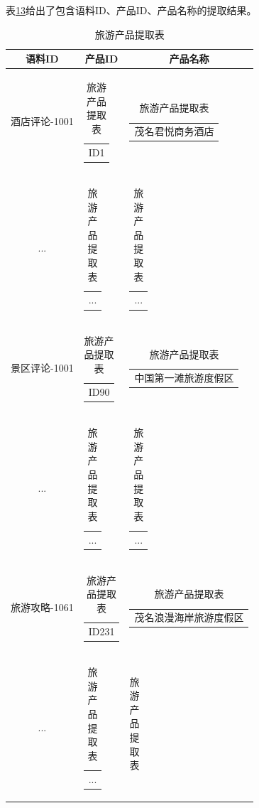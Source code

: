 \documentclass[bwprint]{gmcmthesis}
\begin{document}
表\ref{entity_related}给出了包含语料ID、产品ID、产品名称的提取结果。

\begin{center}
  \begin{longtable}{c|c|c}
    \caption{旅游产品提取表}
    \label{entity_related}\\
      \hline
      \textbf{语料ID} & \textbf{产品ID} & \textbf{产品名称} \\
      \hline
      酒店评论-1001 & \begin{tabular}[c]{@{}c@{}}
        ID1
        \end{tabular} 
        & \begin{tabular}[c]{@{}l@{}}
          茂名君悦商务酒店
        \end{tabular} \\
        ... & \begin{tabular}[c]{@{}c@{}}
          ...
        \end{tabular} 
        & \begin{tabular}[c]{@{}l@{}}
          ...
        \end{tabular} \\
        景区评论-1001 & \begin{tabular}[c]{@{}c@{}}
          ID90
          \end{tabular} 
          & \begin{tabular}[c]{@{}l@{}}
            中国第一滩旅游度假区
          \end{tabular} \\
          ... & \begin{tabular}[c]{@{}c@{}}
            ...
          \end{tabular} 
          & \begin{tabular}[c]{@{}l@{}}
            ...
          \end{tabular} \\
          旅游攻略-1061 & \begin{tabular}[c]{@{}c@{}}
            ID231
            \end{tabular} 
            & \begin{tabular}[c]{@{}l@{}}
              茂名浪漫海岸旅游度假区
            \end{tabular} \\
            ... & \begin{tabular}[c]{@{}c@{}}
              ...
            \end{tabular} 
            & \begin{tabular}[c]{@{}l@{}}

\end{tabular}
\end{longtable}
\end{center}
\end{document}
